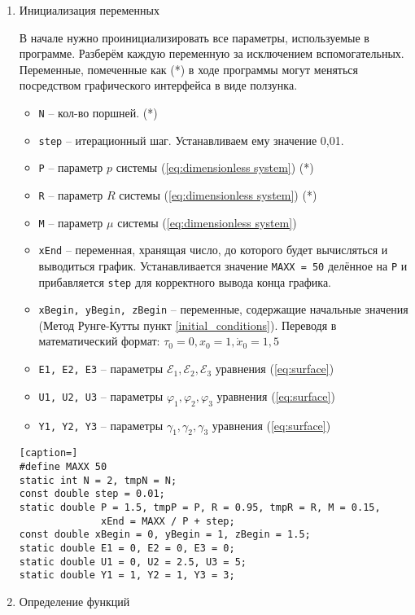 \begin{enumerate}
\item Инициализация переменных

В начале нужно проинициализировать все параметры, используемые в программе. Разберём каждую переменную за исключением вспомогательных. Переменные, помеченные как (*) в ходе программы могут меняться посредством графического интерфейса в виде ползунка.

\begin{itemize}
\item \texttt{N} -- кол-во поршней. (*)
\item \texttt{step} -- итерационный шаг. Устанавливаем ему значение 0,01.
\item \texttt{P} -- параметр $p$ системы (\ref{eq:dimensionless system}) (*)
\item \texttt{R} -- параметр $R$ системы (\ref{eq:dimensionless system}) (*)
\item \texttt{M} -- параметр $\mu$ системы (\ref{eq:dimensionless system})
\item \texttt{xEnd} -- переменная, хранящая число, до которого будет вычисляться и выводиться график. Устанавливается значение \texttt{MAXX = 50} делённое на \texttt{P} и прибавляется \texttt{step} для корректного вывода конца графика.
\item \texttt{xBegin, yBegin, zBegin} -- переменные, содержащие начальные значения (Метод Рунге-Кутты пункт \ref{initial_conditions}). Переводя в математический формат: $\tau_0 = 0, x_0 = 1, \dot x_0 = 1,5$
\item \texttt{E1, E2, E3} -- параметры $\mathcal{E}_1, \mathcal{E}_2, \mathcal{E}_3$ уравнения (\ref{eq:surface})
\item \texttt{U1, U2, U3} -- параметры $\varphi_1, \varphi_2, \varphi_3$ уравнения (\ref{eq:surface})
\item \texttt{Y1, Y2, Y3} -- параметры $\gamma_1, \gamma_2, \gamma_3$ уравнения (\ref{eq:surface})
\end{itemize}

\begin{lstlisting}[caption=]
#define MAXX 50
static int N = 2, tmpN = N;
const double step = 0.01;
static double P = 1.5, tmpP = P, R = 0.95, tmpR = R, M = 0.15,
              xEnd = MAXX / P + step;
const double xBegin = 0, yBegin = 1, zBegin = 1.5;
static double E1 = 0, E2 = 0, E3 = 0;
static double U1 = 0, U2 = 2.5, U3 = 5;
static double Y1 = 1, Y2 = 1, Y3 = 3;
\end{lstlisting}
\newpage
\item Определение функций


\end{enumerate}
